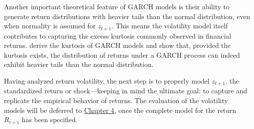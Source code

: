 Another important theoretical feature of GARCH models is their ability to generate return distributions with heavier tails than the normal distribution, even when normality is assumed for $z_{t+1}$. This means the volatility model itself contributes to capturing the excess kurtosis commonly observed in financial returns.  derive the kurtosis of GARCH models and show that, provided the kurtosis exists, the distribution of returns under a GARCH process can indeed exhibit heavier tails than the normal distribution.

Having analyzed return volatility, the next step is to properly model $z_{t+1}$, the standardized return or shock—keeping in mind the ultimate goal: to capture and replicate the empirical behavior of returns. The evaluation of the volatility models will be deferred to \hyperref[chap:4]{Chapter 4}, once the complete model for the return $R_{t+1}$ has been specified.
\newpage